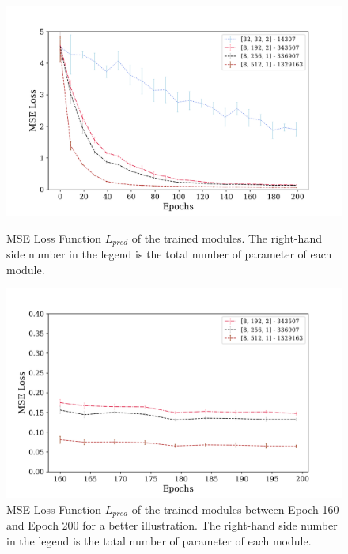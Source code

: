         \begin{figure}[hbtp]
                \centering
                \includegraphics[width=15cm, keepaspectratio]{images/results/module_scalability_1.png}
                \caption{MSE Loss Function $L_{pred}$ of the trained modules. The right-hand side number in the legend is the total number of parameter of each module.}
                \label{fig:results_scalability_1}
                
                \vspace{1.5cm}
                
                \includegraphics[width=15cm, keepaspectratio]{images/results/module_scalability_2.png}
                \caption{MSE Loss Function $L_{pred}$ of the trained modules between Epoch 160 and Epoch 200 for a better illustration. The right-hand side number in the legend is the total number of parameter of each module.}
                \label{fig:results_scalability_2}
        \end{figure}
        
